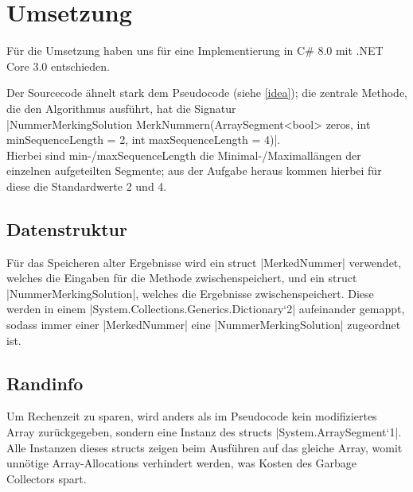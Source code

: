 \documentclass[a4paper,10pt,ngerman]{scrartcl}
\begin{document}
\section{Umsetzung}

Für die Umsetzung haben uns für eine Implementierung in C\# 8.0 mit
.NET Core 3.0 entschieden.

Der Sourcecode ähnelt stark dem Pseudocode (siehe \cref{idea});
die zentrale Methode, die den Algorithmus ausführt, hat die Signatur\\
|NummerMerkingSolution MerkNummern(ArraySegment<bool> zeros, int minSequenceLength = 2, int maxSequenceLength = 4)|.\\
Hierbei sind min-/maxSequenceLength die Minimal-/Maximallängen
der einzelnen aufgeteilten Segmente; aus der Aufgabe heraus kommen hierbei
für diese die Standardwerte 2 und 4.

\subsection{Datenstruktur}

Für das Speicheren alter Ergebnisse wird ein struct |MerkedNummer|
verwendet, welches die Eingaben für die Methode zwischenspeichert,
und ein struct |NummerMerkingSolution|, welches die Ergebnisse
zwischenspeichert. Diese werden in einem
|System.Collections.Generics.Dictionary`2| aufeinander gemappt,
sodass immer einer |MerkedNummer| eine |NummerMerkingSolution|
zugeordnet ist.

\subsection{Randinfo}

Um Rechenzeit zu sparen, wird anders als im Pseudocode kein modifiziertes
Array zurückgegeben, sondern eine Instanz des structs |System.ArraySegment`1|.
Alle Instanzen dieses structs zeigen beim Ausführen auf das gleiche Array,
womit unnötige Array-Allocations verhindert werden, was Kosten des
Garbage Collectors spart.
\end{document}
